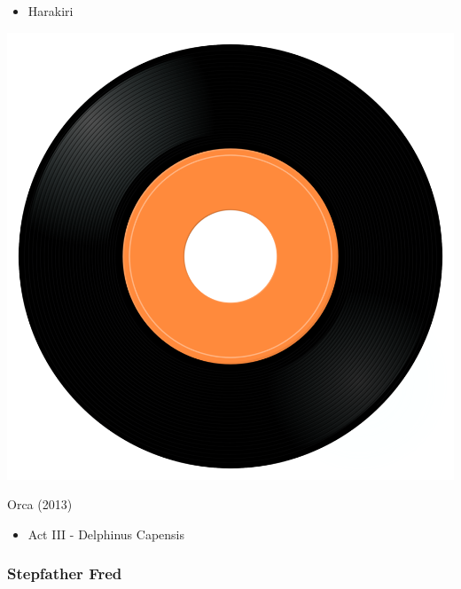 \begin{minipage}[t]{0.25\textwidth}\vspace{0pt}
\begin{itemize}[nosep,leftmargin=1em,labelwidth=*,align=left]
	\setlength{\itemsep}{0pt}
	\item Harakiri
\end{itemize}
\end{minipage}
\begin{minipage}[t]{0.25\textwidth}
\captionsetup{type=figure}
\includegraphics[width=\textwidth]{Images/cover.png}
\caption*{Orca (2013)}
\end{minipage}
\begin{minipage}[t]{0.25\textwidth}\vspace{0pt}
\begin{itemize}[nosep,leftmargin=1em,labelwidth=*,align=left]
	\setlength{\itemsep}{0pt}
	\item Act III - Delphinus Capensis
\end{itemize}
\end{minipage}

\subsubsection{Stepfather Fred}

